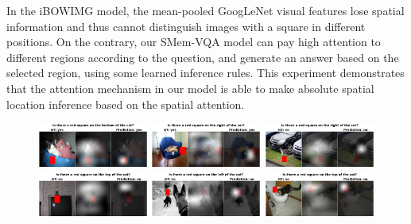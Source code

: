 In the iBOWIMG model, the mean-pooled GoogLeNet visual features lose spatial information and thus cannot distinguish images with a square in different positions. On the contrary, our SMem-VQA model can pay high attention to different regions according to the question, and generate an answer based on the selected region, using some learned inference rules.
This experiment demonstrates that the attention mechanism in our model is able to make absolute spatial location inference based on the spatial attention. 


\begin{figure}[t]
  \includegraphics[width=0.325\textwidth]{figures/bottom_COCO_val2014_000000167602_bottom.jpg}
  \includegraphics[width=0.325\textwidth]{figures/right_COCO_val2014_0000002988_right.jpg}
  \includegraphics[width=0.325\textwidth]{figures/right_COCO_val2014_000000172330_bottom.jpg}\\
  \includegraphics[width=0.325\textwidth]{figures/top_COCO_val2014_00000010694_bottom}
  \includegraphics[width=0.325\textwidth]{figures/left_COCO_val2014_000000201918_top.jpg}
  \includegraphics[width=0.325\textwidth]{figures/top_COCO_val2014_000000218924_left.jpg}

\end{figure}
